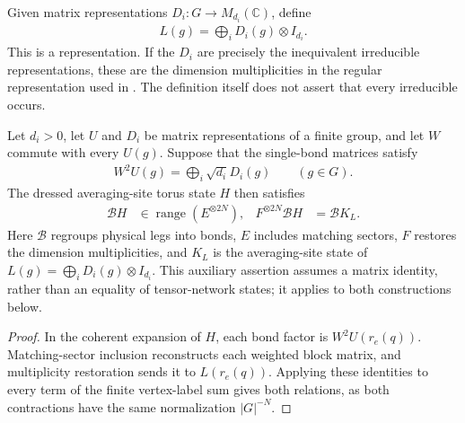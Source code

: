 \begin{definition}%
    \label{def:peps_multiplicity_restored_representation}
    \leanok
    Given matrix representations $D_i:G\to M_{d_i}(\mathbb C)$, define
    \begin{align}
        L(g)=\bigoplus_iD_i(g)\otimes I_{d_i}.
    \end{align}
    This is a representation. If the $D_i$ are precisely the inequivalent
    irreducible representations, these are the dimension multiplicities
    in the regular representation used in \cite[Section~7]{Schuch2010PEPS}.
    The definition itself does not assert that every irreducible occurs.
\end{definition}

\begin{lemma}%
    \label{thm:peps_torus_weighted_blocks_state}
    \leanok
    Let $d_i>0$, let $U$ and $D_i$ be matrix representations of a finite group,
    and let $W$ commute with every $U(g)$. Suppose that the single-bond matrices satisfy
    \begin{align}
        W^2U(g)=\bigoplus_i\sqrt{d_i}D_i(g) \qquad(g\in G).
    \end{align}
    The dressed averaging-site torus state $H$ then satisfies
    \begin{align}
        \mathcal B H               & \in\operatorname{range}(E^{\otimes 2N}), &
        F^{\otimes 2N}\mathcal B H & =\mathcal B K_L.
    \end{align}
    Here $\mathcal B$ regroups physical legs into bonds, $E$ includes matching sectors,
    $F$ restores the dimension multiplicities, and $K_L$ is the averaging-site
    state of $L(g)=\bigoplus_iD_i(g)\otimes I_{d_i}$.
    This auxiliary assertion assumes a matrix identity, rather than an equality
    of tensor-network states; it applies to both constructions below.
\end{lemma}

\begin{proof}\leanok
    In the coherent expansion of $H$, each bond factor is $W^2U(r_e(q))$.
    Matching-sector inclusion reconstructs each weighted block
    matrix, and multiplicity restoration sends it to $L(r_e(q))$.
    Applying these identities to every term of the finite vertex-label sum
    gives both relations, as both contractions have the same normalization $|G|^{-N}$.
\end{proof}

